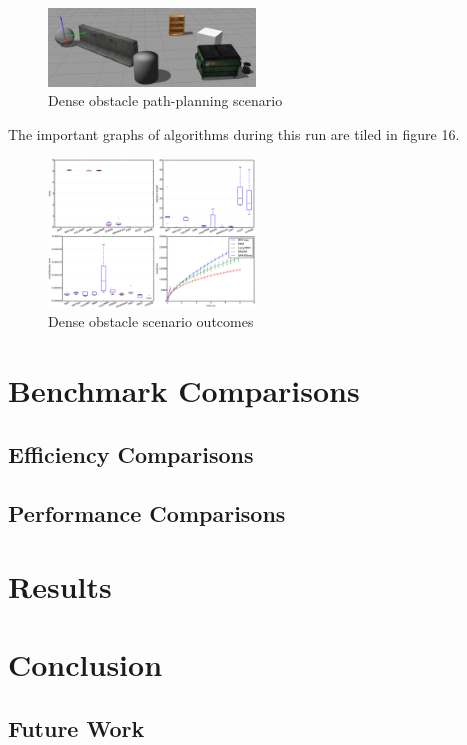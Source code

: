 \documentclass[conference]{IEEEtran} \usepackage[T1]{fontenc} \usepackage[backend=biber, style=ieee]{biblatex}
\begin{document}
\begin{figure}
\label{figure15} 
\centering 
\includegraphics[width=0.49\textwidth]{scenario_3}
\caption{Dense obstacle path-planning scenario}
\end{figure}

The important graphs of algorithms during this run are tiled in figure 16. 

\begin{figure}
\label{figure16} 
\centering 
\includegraphics[width=0.49\textwidth]{s3_outcomes}
\caption{Dense obstacle scenario outcomes}
\end{figure}

\section{Benchmark Comparisons} \label{Benchmark Comparison}


\subsection{Efficiency Comparisons} \label{Efficiency Comparisons}

\subsection{Performance Comparisons} \label{Performance Comparisons}

\section{Results} \label{Results}

\section{Conclusion} \label{Conclusion}

\subsection{Future Work}

\printbibliography
\end{document}

